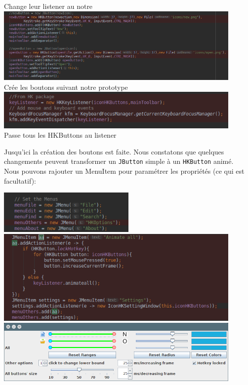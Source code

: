 \documentclass[12pt,a4paper]{article}
\begin{document}
\begin{enumerate}
\begin{center}
	Change leur listener au notre\\
	\includegraphics[width=0.9\textwidth]{06.png}\\
	Crée les boutons suivant notre prototype\\
	\includegraphics[width=0.9\textwidth]{07.png}\\
	Passe tous les HKButtons au listener
\end{center}
Jusqu'ici la création des boutons est faite. Nous constatons que quelques changements peuvent transformer un \texttt{JButton} simple à un \texttt{HKButton} animé.\\
Nous pouvons rajouter un MenuItem pour paramétrer les propriétés (ce qui est facultatif):
\begin{center}
	\includegraphics[width=0.5\textwidth]{03.png}\\
	\includegraphics[width=0.9\textwidth]{05.png}\\
	\includegraphics[width=0.9\textwidth]{16.png}\\

\end{center}
\end{enumerate}
\end{document}
